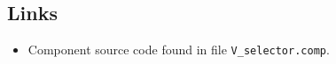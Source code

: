 \subsection*{Links}
\begin{itemize}
  \item Component source code found in file \texttt{V\_selector.comp}.
\end{itemize}
